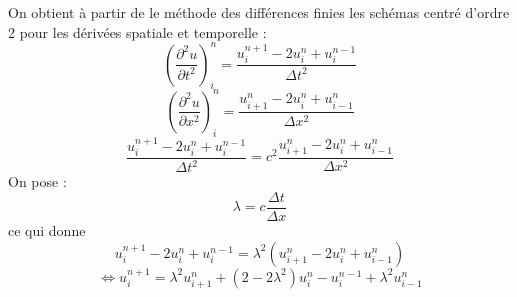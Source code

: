 On obtient à partir de le méthode des différences finies les schémas centré d'ordre 2 pour les dérivées spatiale et temporelle : 
\begin{equation*}
(\frac{\partial^2u}{\partial t^2})^{n}_{i} = \frac{u^{n+1}_{i} - 2u^{n}_{i} + u^{n-1}_{i}}{\Delta t^2}
\end{equation*}
\vspace*{3 mm}
\begin{equation*}
(\frac{\partial^2u}{\partial x^2})^{n}_{i} = \frac{u^{n}_{i+1} - 2u^{n}_{i} + u^{n}_{i-1}}{\Delta x^2}
\end{equation*}
\vspace*{3 mm}
\begin{equation*}
\frac{u^{n+1}_{i} - 2u^{n}_{i} + u^{n-1}_{i}}{\Delta t^2} = c^2 \frac{u^{n}_{i+1} - 2u^{n}_{i} + u^{n}_{i-1}}{\Delta x^2}
\end{equation*}
\hspace*{0.6cm} On pose :
\begin{equation*}
\lambda = c \frac{\Delta t}{\Delta x}
\end{equation*}
\hspace*{0.6cm} ce qui donne
\begin{equation*}
u^{n+1}_{i} - 2u^{n}_{i} + u^{n-1}_{i} = \lambda ^2 (u^{n}_{i+1} - 2u^{n}_{i} + u^{n}_{i-1})
\end{equation*}
\vspace*{3 mm}
\begin{equation*}
\Leftrightarrow
\boxed{
u^{n+1}_{i} = \lambda ^2 u^{n}_{i+1} + (2 - 2\lambda ^2)u^{n}_{i} - u^{n-1}_{i} + \lambda ^2 u^{n}_{i-1}}
\end{equation*}

\vspace*{7 mm}

